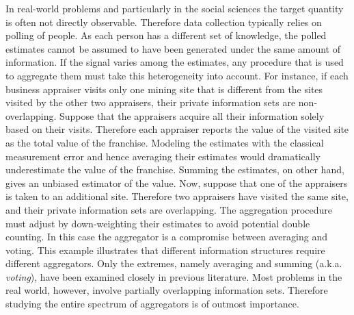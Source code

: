 \documentclass[11pt,twoside]{article}
\theoremstyle{definition}
\theoremstyle{definition}
\begin{document}
In real-world problems and particularly in the social sciences the target quantity is often not directly observable. Therefore data collection typically relies on polling of people. As each person has a different set of knowledge, the polled estimates cannot be assumed to have been generated under the same amount of information. If the signal varies among the estimates, any procedure that is used to aggregate them must take this heterogeneity into account. For instance, if each business appraiser visits only one mining site that is different from the sites visited by the other two appraisers, their private information sets are non-overlapping. Suppose that the appraisers acquire all their information solely based on their visits. Therefore each appraiser reports the value of the visited site as the total value of the franchise.  Modeling the estimates with the classical measurement error and hence averaging their estimates would dramatically underestimate the value of the franchise. Summing the estimates, on other hand, gives an unbiased estimator of the value. Now, suppose that one of the appraisers is taken to an additional site. Therefore two appraisers have visited the same site, and their private information sets are overlapping. The aggregation procedure must adjust by down-weighting their estimates to avoid potential double counting.  In this case the aggregator is a compromise between averaging and voting. This example illustrates that different information structures require different aggregators.  Only the extremes, namely averaging and summing (a.k.a. \textit{voting}), have been examined closely in previous literature. Most problems in the real world, however, involve partially overlapping information sets. Therefore studying the entire spectrum of aggregators is of outmost importance. 
\end{document}
